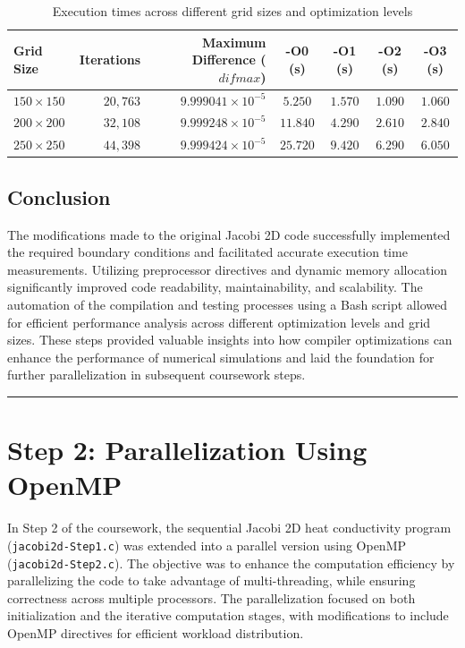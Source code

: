 \documentclass{article}
\begin{document}
\begin{table}[h]
    \centering
    \begin{tabular}{lrrcccc}
    \toprule
    \textbf{Grid Size} & \textbf{Iterations} & \textbf{Maximum Difference ($difmax$)} & \textbf{-O0 (s)} & \textbf{-O1 (s)} & \textbf{-O2 (s)} & \textbf{-O3 (s)} \\
    \midrule
    $150\times150$ & $20,763$ & $9.999041\times10^{-5}$ & $5.250$ & $1.570$ & $1.090$ & $1.060$ \\
    $200\times200$ & $32,108$ & $9.999248\times10^{-5}$ & $11.840$ & $4.290$ & $2.610$ & $2.840$ \\
    $250\times250$ & $44,398$ & $9.999424\times10^{-5}$ & $25.720$ & $9.420$ & $6.290$ & $6.050$ \\
    \bottomrule
    \end{tabular}
    \caption{Execution times across different grid sizes and optimization levels}
    \label{tab:execution_times}
\end{table}

\subsection{Conclusion}

The modifications made to the original Jacobi 2D code successfully implemented the required boundary conditions and facilitated accurate execution time measurements. Utilizing preprocessor directives and dynamic memory allocation significantly improved code readability, maintainability, and scalability. The automation of the compilation and testing processes using a Bash script allowed for efficient performance analysis across different optimization levels and grid sizes. These steps provided valuable insights into how compiler optimizations can enhance the performance of numerical simulations and laid the foundation for further parallelization in subsequent coursework steps.

\rule{\linewidth}{0.5pt}
\newpage

\section{Step 2: Parallelization Using OpenMP}

In Step 2 of the coursework, the sequential Jacobi 2D heat conductivity program (\texttt{jacobi2d-Step1.c}) was extended into a parallel version using OpenMP (\texttt{jacobi2d-Step2.c}). The objective was to enhance the computation efficiency by parallelizing the code to take advantage of multi-threading, while ensuring correctness across multiple processors. The parallelization focused on both initialization and the iterative computation stages, with modifications to include OpenMP directives for efficient workload distribution.
\end{document}
